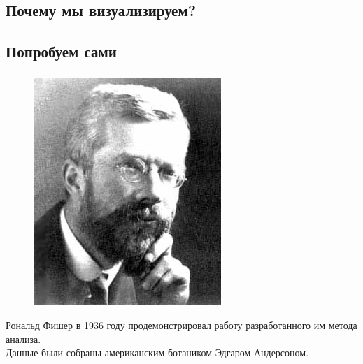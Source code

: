 \documentclass[t,aspectratio=169]{beamer}  %
\begin{document}
\subsection{Почему мы визуализируем?}

\begin{frame}[plain,c]
    \frametitle{\insertsection} 
    \framesubtitle{\insertsubsection}
\end{frame}

\begin{frame}[plain,c]
    \frametitle{\insertsection} 
    \framesubtitle{\insertsubsection}
\end{frame}

\subsection{Попробуем сами}

\begin{frame}
    \frametitle{\insertsection} 
    \framesubtitle{\insertsubsection}
    \begin{figure}
        \vspace{-0.5cm}
        \includegraphics[width=\linewidth]{Fischer.jpg}
    \end{figure}
    Рональд Фишер в 1936 году продемонстрировал работу разработанного им метода анализа.\vspace{1cm}\\
    Данные были собраны американским ботаником Эдгаром Андерсоном.
\end{frame}
\end{document}
